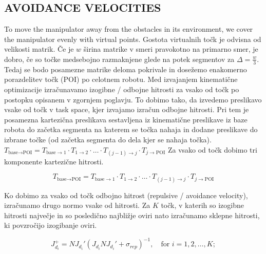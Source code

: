 \documentclass[letterpaper, 10 pt, conference]{ieeeconf}  %
\begin{document}
\subsection{AVOIDANCE VELOCITIES}

To move the manipulator away from the obstacles in its environment, we cover the manipulator evenly with virtual points. Gostota virtualnih točk je odvisna od velikosti matrik. Če je $w$ širina matrike v smeri pravokotno na primarno smer, je dobro, če so točke medsebojno razmaknjene glede na potek segmentov za $\Delta = \frac{w}{3}$. Tedaj se bodo posamezne matrike deloma pokrivale in dosežemo enakomerno porazdelitev točk (POI) po celotnem robotu. Med izvajanjem kinematične optimizacije izračunavamo izogibne / odbojne hitrosti za vsako od točk po postopku opisanem v zgornjem poglavju.  To dobimo tako, da izvedemo preslikavo vsake od točk v task space, kjer izvajamo izračun odbojne hitrosti. Pri tem je posamezna kartezična preslikava sestavljena iz kinematične preslikave iz baze robota do začetka segmenta na katerem se točka nahaja in dodane preslikave do izbrane točke (od začetka segmenta do dela kjer se nahaja točka). \(T_{\text{base} \rightarrow \text{POI}} = T_{\text{base} \rightarrow 1} \cdot T_{1 \rightarrow 2} \cdot \ldots \cdot T_{(j-1) \rightarrow j} \cdot T_{j \rightarrow \text{POI}}\) Za vsako od točk dobimo tri komponente kartezične hitrosti. 

\begin{equation}
	T_{\text{base} \rightarrow \text{POI}} = T_{\text{base} \rightarrow 1} \cdot T_{1 \rightarrow 2} \cdot \ldots \cdot T_{(j-1) \rightarrow j} \cdot T_{j \rightarrow \text{POI}}	
\end{equation}


Ko dobimo za vsako od točk odbojno hitrost (repulsive / avoidance velocity), izračunamo drugo normo vsake od hitrosti. Za $K$ točk, v katerih so izogibne hitrosti največje in so posledično najbližje oviri nato izračunamo sklepne hitrosti, ki povzročijo izogibanje oviri. 


\begin{equation}
	J_{d_i}^{+} = N J_{d_i}' (J_{d_i} N J_{d_i}' + \sigma_{rep})^{-1}, \quad \text{for } i = 1, 2, \ldots, K;
\end{equation}
\end{document}
